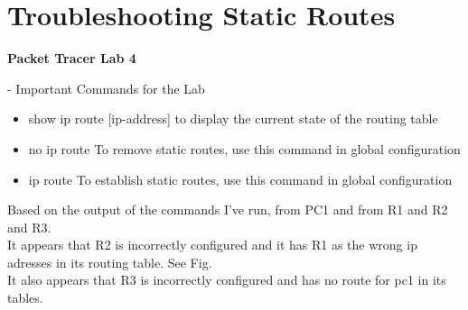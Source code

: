 \documentclass[../EngineeringJournal_CDavis.tex]{subfiles}
\begin{document}

\chapter[Troubleshooting Static Routes]{Troubleshooting \linebreak[1] Static Routes \hspace*{\fill}{Feb 4, 2020}}
\noindent\textbf{{Packet Tracer Lab 4} }                             

\hspace{0.2cm}
\begin{tcolorbox}[width=6.3in]
\scriptsize 
- Important Commands for the Lab
  \begin{itemize}
    \item{show ip route [ip-address]} to display the current state of the routing table
    \item{no ip route} To remove static routes, use this command in global configuration
    \item{ip route} To establish static routes, use this command in global configuration 
  \end{itemize}
\end{tcolorbox}
\hspace{0.2cm}
\normalsize  

\newpage

Based on the output of the commands I've run, from PC1 and from R1 and R2 and R3. 
\\It appears that R2 is incorrectly configured and it has R1 as the wrong ip adresses
in its routing table. See Fig.
\\It also appears that R3 is incorrectly configured and has no route for pc1 in its
tables.
\end{document}
